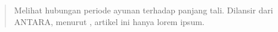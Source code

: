 \begin{abstract}
    Melihat hubungan periode ayunan terhadap panjang tali. Dilansir dari ANTARA, menurut 
    \cite{rudi26}, 
    artikel ini hanya lorem ipsum. 
\end{abstract}